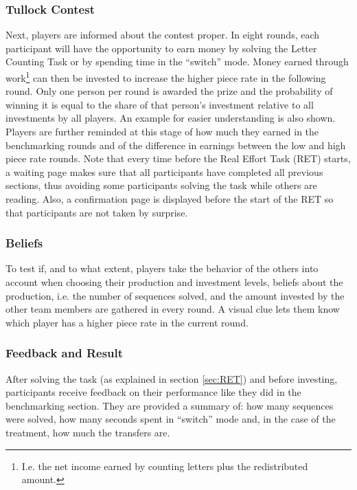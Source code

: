     \subsubsection{Tullock Contest}
    
    Next, players are informed about the contest proper. In eight rounds, each participant will have the opportunity to earn money by solving the Letter Counting Task or by spending time in the ``switch'' mode. Money earned through work\footnote{I.e. the net income earned by counting letters plus the redistributed amount.} can then be invested to increase the higher piece rate in the following round. Only one person per round is awarded the prize and the probability of winning it is equal to the share of that person's investment relative to all investments by all players. An example for easier understanding is also shown.\\
    
    Players are further reminded at this stage of how much they earned in the benchmarking rounds and of the difference in earnings between the low and high piece rate rounds. Note that every time before the Real Effort Task (RET) starts, a waiting page makes sure that all participants have completed all previous sections, thus avoiding some participants solving the task while others are reading. Also, a confirmation page is displayed before the start of the RET so that participants are not taken by surprise.
    
    \subsubsection{Beliefs}
    
    To test if, and to what extent, players take the behavior of the others into account when choosing their production and investment levels, beliefs about the production, i.e. the number of sequences solved, and the amount invested by the other team members are gathered in every round. A visual clue lets them know which player has a higher piece rate in the current round.
    
    \subsubsection{Feedback and Result}
    
    After solving the task (as explained in section \ref{sec:RET}) and before investing, participants receive feedback on their performance like they did in the benchmarking section. They are provided a summary of: how many sequences were solved, how many seconds spent in ``switch'' mode and, in the case of the treatment, how much the transfers are.\\
    
